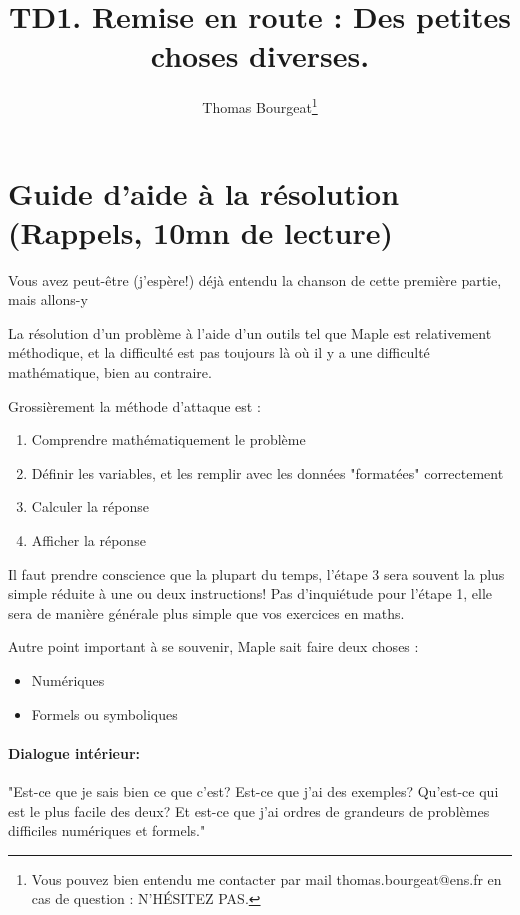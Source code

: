 \documentclass[10pt,a4paper]{article}
\begin{document}
\title{TD1. Remise en route : Des petites choses diverses.}
\author{Thomas Bourgeat\footnote{Vous pouvez bien entendu me contacter par mail thomas.bourgeat@ens.fr en cas de question : N'HÉSITEZ PAS.}}
\maketitle{}

\section{Guide d'aide à la résolution (Rappels, 10mn de lecture)}

Vous avez peut-être (j'espère!) déjà entendu la chanson de cette première partie, mais allons-y

La résolution d'un problème à l'aide d'un outils tel que Maple est relativement méthodique, et la difficulté est pas toujours là 
où il y a une difficulté mathématique, bien au contraire.

Grossièrement la méthode d'attaque est :
\begin{enumerate}
\item Comprendre mathématiquement le problème
\item Définir les variables, et les remplir avec les données "formatées" correctement
\item Calculer la réponse
\item Afficher la réponse
\end{enumerate}

Il faut prendre conscience que la plupart du temps, l'étape 3 sera souvent la plus simple réduite à une ou deux instructions! Pas d'inquiétude pour l'étape 1, elle sera de manière générale plus simple que vos exercices en maths.

Autre point important à se souvenir, Maple sait faire deux choses :
\begin{itemize}
\item Numériques
\item Formels ou symboliques
\end{itemize}

\paragraph{Dialogue intérieur:} "Est-ce que je sais bien ce que c'est? Est-ce que j'ai des exemples? Qu'est-ce qui est le plus facile des deux? Et est-ce que j'ai ordres de grandeurs de problèmes difficiles numériques et formels."
\end{document}
